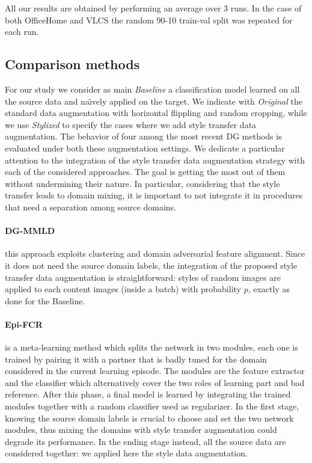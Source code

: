 All our results are obtained by performing an average over 3 runs. In the case of both OfficeHome and VLCS the random 90-10 train-val split was repeated for each run.


\subsection{Comparison methods}
For our study we consider as main \emph{Baseline} a classification model learned on all the source data and na\"{\i}vely applied on the target. We indicate with \emph{Original} the standard data augmentation with horizontal flippling and random cropping, while we use \emph{Stylized} to specify the cases where we add style transfer data augmentation.
The behavior of four among the most recent DG methods is evaluated under both these augmentation settings. We dedicate a particular attention to the integration of the style transfer data augmentation strategy with each of the considered approaches. The goal is getting the most out of them without undermining their nature. In particular, considering that the style transfer leads to domain mixing, it is important to not integrate it in procedures that need a separation among source domains.
\paragraph{DG-MMLD~\cite{dg_mmld}} this approach exploits clustering and domain adversarial feature alignment. Since it does not need the source domain labels, the integration of the proposed style transfer data augmentation is straightforward: styles of random images are applied to each content images (inside a batch) with probability $p$, exactly as done for the Baseline.
\paragraph{Epi-FCR~\cite{episodic_hospedales}} is a meta-learning method which splits the network in two modules, each one is trained by pairing it with a partner that is badly tuned for the domain considered in the current learning episode. The modules are the feature extractor and the classifier which alternatively cover the two roles of learning part and bad reference. After this phase, a final model is learned by integrating the trained modules together with a random classifier used as regularizer. In the first stage, knowing the source domain labels is crucial to choose and set the two network modules, thus mixing the domains with style transfer augmentation could degrade its performance. In the ending stage instead, all the source data are considered together: we applied here the style data augmentation.  
